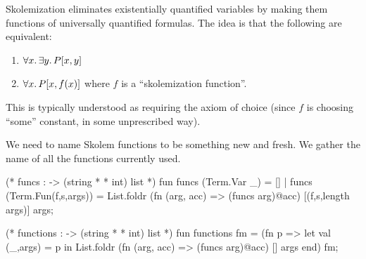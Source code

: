 \begin{node}
Skolemization eliminates existentially quantified variables by making
them functions of universally quantified formulas. The idea is that
the following are equivalent:
\begin{enumerate}
\item $\forall x\ldotp\exists y\ldotp P[x,y]$
\item $\forall x\ldotp P[x, f(x)]$ where $f$ is a ``skolemization function''.
\end{enumerate}
This is typically understood as requiring the axiom of choice (since
$f$ is choosing ``some'' constant, in some unprescribed way).
\end{node}

\begin{node}
We need to name Skolem functions to be something new and fresh. We
gather the name of all the functions currently used.
\end{node}

\nwenddocs{}\endmoddef\nwstartdeflinemarkup{}\nwenddeflinemarkup
(* funcs :  -> (string *  * int) list *)
fun funcs (Term.Var _) = []
  | funcs (Term.Fun(f,s,args)) =
      List.foldr (fn (arg, acc) =>
                   (funcs arg)@acc)
                 [(f,s,length args)]
                 args;

(* functions :  -> (string *  * int) list *)
fun functions fm =
    (fn p => let val (_,args) =  p
             in List.foldr (fn (arg, acc) => (funcs arg)@acc)
                           []
                           args
             end)
    fm;
\nwendcode{}\nwdocspar

